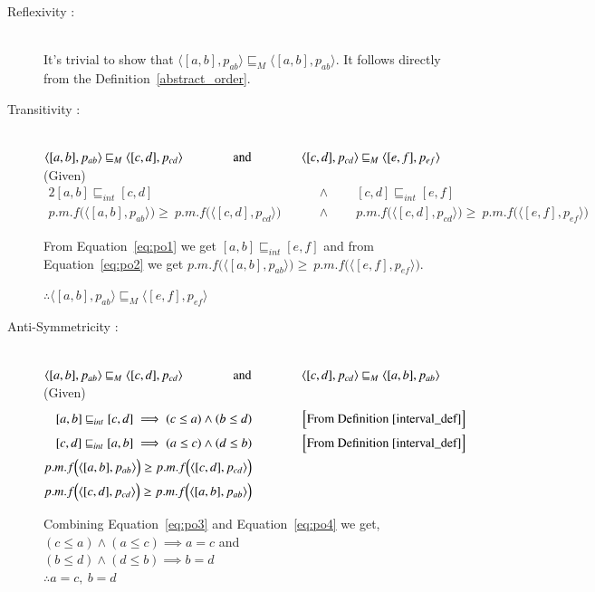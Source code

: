 \documentclass[final,3p, review, times]{Elsevier/elsarticle}
\begin{document}
\begin{description}
\item[Reflexivity :] \hfill \\
	It's trivial to show that $\langle[a,b],p_{ab}\rangle\sqsubseteq_M\langle[a,b],p_{ab}\rangle$. It follows directly from the Definition~\ref{abstract_order}.
\item[Transitivity :] \hfill \\
	$\langle[a,b],p_{ab}\rangle\sqsubseteq_M\langle[c,d],p_{cd}\rangle\qquad\qquad\mathrm{and}\qquad\qquad\langle[c,d],p_{cd}\rangle\sqsubseteq_M\langle[e,f],p_{ef}\rangle\hfill$ (Given)	
\begin{alignat}{2}
    [a,b]\sqsubseteq_{int}[c,d] &\qquad\land\qquad[c,d]\sqsubseteq_{int}[e,f]\label{eq:po1}\\
	p.m.f\Big(\langle[a,b],p_{ab}\rangle\Big)\geq\ p.m.f\Big(\langle[c,d],p_{cd}\rangle\Big) &\qquad\land\qquad p.m.f\Big(\langle[c,d],p_{cd}\rangle\Big)\geq\ p.m.f\Big(\langle[e,f],p_{ef}\rangle\Big)\label{eq:po2}
\end{alignat}
	
\noindent From Equation~\ref{eq:po1} we get $[a,b]\sqsubseteq_{int}[e,f]$ and from Equation~\ref{eq:po2} we get $p.m.f\Big(\langle[a,b],p_{ab}\rangle\Big)\geq\ p.m.f\Big(\langle[e,f],p_{ef}\rangle\Big)$.
	
	$\therefore\langle[a,b],p_{ab}\rangle\sqsubseteq_M\langle[e,f],p_{ef}\rangle$
\item[Anti-Symmetricity :] \hfill \\
	$\langle[a,b],p_{ab}\rangle\sqsubseteq_M\langle[c,d],p_{cd}\rangle\qquad\qquad\mathrm{and}\qquad\qquad\langle[c,d],p_{cd}\rangle\sqsubseteq_M\langle[a,b],p_{ab}\rangle\hfill$ (Given)
\begin{alignat}{2}
    [a,b]\sqsubseteq_{int}[c,d]\implies (c\leq a)\land (b\leq d)&\qquad\qquad\Big[\mathrm{From\ Definition}~\ref{interval_def}\Big]\label{eq:po3}\\
	[c,d]\sqsubseteq_{int}[a,b]\implies (a\leq c)\land (d\leq b)&\qquad\qquad\Big[\mathrm{From\ Definition}~\ref{interval_def}\Big]\label{eq:po4}\\
	p.m.f\Big(\langle[a,b],p_{ab}\rangle\Big)\geq p.m.f\Big(\langle[c,d],p_{cd}\rangle\Big)&\label{eq:po5}\\
	p.m.f\Big(\langle[c,d],p_{cd}\rangle\Big)\geq p.m.f\Big(\langle[a,b],p_{ab}\rangle\Big)&\label{eq:po6}
\end{alignat}

\noindent Combining Equation~\ref{eq:po3} and Equation~\ref{eq:po4} we get,\\
	$(c\leq a)\land (a\leq c)\implies a=c$ and\\
	$(b\leq d)\land (d\leq b)\implies b=d$\\
	$\therefore a=c,\ b=d$
	

\end{description}
\end{document}
